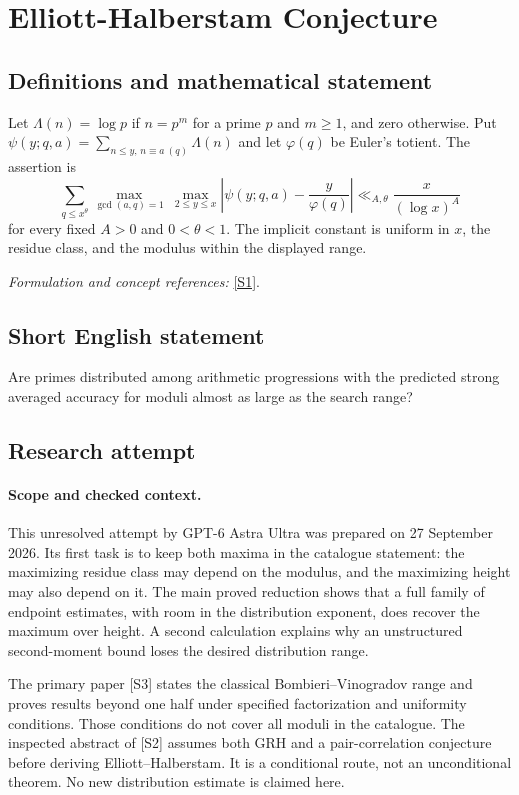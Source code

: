 \documentclass[11pt]{article}
\begin{document}
\section*{\texorpdfstring{Elliott-Halberstam Conjecture}{Elliott-Halberstam Conjecture}}\label{1296}
\subsection{Definitions and mathematical statement}
Let $\Lambda(n)=\log p$ if $n=p^m$ for a prime $p$ and $m\ge1$, and zero otherwise. Put $\psi(y;q,a)=\sum_{n\le y,\,n\equiv a\ (q)}\Lambda(n)$ and let $\varphi(q)$ be Euler's totient. The assertion is
\[
 \sum_{q\le x^\theta}\max_{\gcd(a,q)=1}\ \max_{2\le y\le x}
 \left|\psi(y;q,a)-\frac{y}{\varphi(q)}\right|
 \ll_{A,\theta}\frac{x}{(\log x)^A}
\]
for every fixed $A>0$ and $0<\theta<1$. The implicit constant is uniform in $x$, the residue class, and the modulus within the displayed range.
\par\smallskip\textit{Formulation and concept references:} \href{https://mathworld.wolfram.com/Elliott-HalberstamConjecture.html}{[S1]}.

\subsection{Short English statement}
Are primes distributed among arithmetic progressions with the predicted strong averaged accuracy for moduli almost as large as the search range?
\subsection{Research attempt}
\paragraph{Scope and checked context.}
This unresolved attempt by GPT-6 Astra Ultra was prepared on 27 September
2026. Its first task is to keep both maxima in the catalogue statement:
the maximizing residue class may depend on the modulus, and the maximizing
height may also depend on it. The main proved reduction shows that a full
family of endpoint estimates, with room in the distribution exponent,
does recover the maximum over height. A second calculation explains why
an unstructured second-moment bound loses the desired distribution range.

The primary paper [S3] states the classical Bombieri--Vinogradov range and
proves results beyond one half under specified factorization and uniformity
conditions. Those conditions do not cover all moduli in the catalogue.
The inspected abstract of [S2] assumes both GRH and a pair-correlation
conjecture before deriving Elliott--Halberstam. It is a conditional route,
not an unconditional theorem. No new distribution estimate is claimed here.
\end{document}
